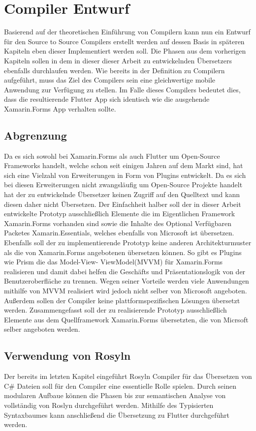 \chapter{Compiler Entwurf}
Basierend auf der theoretischen Einführung von Compilern kann nun ein Entwurf für den Source to Source Compilers erstellt werden auf dessen Basis in späteren Kapiteln eben dieser Implementiert werden soll.  Die Phasen aus dem vorherigen Kapiteln sollen in dem in dieser dieser Arbeit zu entwickelnden Übersetzers ebenfalls durchlaufen werden.  
Wie bereits in der Definition zu Compilern aufgeführt,  muss das Ziel des Compilers sein eine gleichwertige mobile Anwendung zur Verfügung zu stellen.  Im Falle dieses Compilers bedeutet dies,  dass die resultierende Flutter App sich identisch wie die ausgehende Xamarin.Forms App verhalten sollte.  

\section{Abgrenzung}
Da es sich sowohl bei Xamarin.Forms als auch Flutter um Open-Source Frameworks handelt, welche schon seit einigen Jahren auf dem Markt sind,  hat sich  eine Vielzahl von Erweiterungen in Form von Plugins entwickelt.  Da es sich bei diesen Erweiterungen nicht zwangsläufig um Open-Source Projekte handelt hat der zu entwickelnde Übersetzer keinen Zugriff auf den Quelltext und kann diesen daher nicht Übersetzen.  Der Einfachheit halber soll der in dieser Arbeit entwickelte Prototyp ausschließlich Elemente die im Eigentlichen Framework Xamarin.Forms vorhanden sind sowie die Inhalte des Optional Verfügbaren Packetes Xamarin.Essentials, welches ebenfalls von Microsoft ist übersetzen.  Ebenfalls soll der zu implementierende Prototyp keine anderen Architekturmuster als die von Xamarin.Forms angebotenen übersetzen können.  So gibt es  Plugins wie Prism die das Model-View- ViewModel(MVVM) für Xamarin.Forms realisieren und damit dabei helfen die Geschäfts und Präsentationslogik von der Benutzeroberfläche zu trennen.  Wegen seiner Vorteile werden viele Anwendungen mithilfe von MVVM realisiert wird jedoch nicht selber von Microsoft angeboten.  Außerdem sollen der Compiler keine plattformspezifischen Lösungen übersetzt werden.
Zusammengefasst soll der zu realisierende Prototyp ausschließlich Elemente aus dem Quellframework Xamarin.Forms übersetzten, die von Micrsoft selber angeboten werden. 

\section{Verwendung von Rosyln}
Der bereits im letzten Kapitel eingeführt Rosyln Compiler für das Übersetzen von C\# Dateien soll für den Compiler eine essentielle Rolle spielen.  Durch seinen modularen Aufbaue können die Phasen bis zur semantischen Analyse von vollständig von Roslyn durchgeführt werden.  Mithilfe des Typisierten Syntaxbaumes kann anschließend die Übersetzung zu Flutter durchgeführt werden.  

